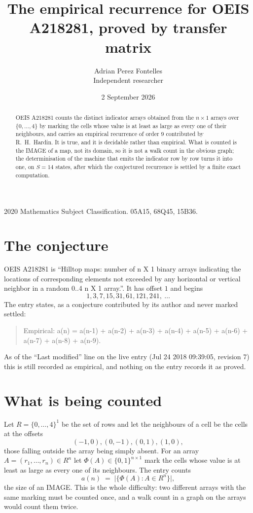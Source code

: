 \documentclass[11pt,a4paper]{article}
\title{The empirical recurrence for OEIS A218281, proved by transfer matrix}
\author{Adrian Perez Fontelles\\ \small Independent researcher}
\date{2 September 2026}
\theoremstyle{plain}
\theoremstyle{definition}
\begin{document}
\maketitle

\begin{abstract}
OEIS A218281 counts the distinct indicator arrays obtained from the $n\times1$ arrays over
$\{0,\dots,4\}$ by marking the cells whose value is at least as large as every one of their neighbours, and carries an
empirical recurrence of order $9$ contributed by R.~H.~Hardin. It is true, and it is
decidable rather than empirical. What is counted is the IMAGE of a map, not its domain, so it
is not a walk count in the obvious graph; the determinisation of the machine that emits the
indicator row by row turns it into one, on $S=14$ states, after which the conjectured
recurrence is settled by a finite exact computation.
\end{abstract}

\noindent\small 2020 Mathematics Subject Classification. 05A15, 68Q45, 15B36.\normalsize

\section{The conjecture}

OEIS A218281 is ``Hilltop maps: number of n X 1 binary arrays indicating the locations of corresponding elements not exceeded by any horizontal or vertical neighbor in a random 0..4 n X 1 array.''. It has offset $1$ and begins
\[
1, 3, 7, 15, 31, 61, 121, 241,\ \dots
\]
The entry states, as a conjecture contributed by its author and never marked settled:
\begin{quote}
Empirical: a(n) = a(n-1) + a(n-2) + a(n-3) + a(n-4) + a(n-5) + a(n-6) + a(n-7) + a(n-8) + a(n-9).
\end{quote}
As of the ``Last modified'' line on the live entry (Jul 24 2018 09:39:05, revision 7) this is still
recorded as empirical, and nothing on the entry records it as proved.

\section{What is being counted}

Let $R=\{0,\dots,4\}^{1}$ be the set of rows and let the neighbours of a cell be the
cells at the offsets
\[
(-1,0), (0,-1), (0,1), (1,0),
\]
those falling outside the array being simply absent. For an array
$A=(r_1,\dots,r_n)\in R^n$ let $\Phi(A)\in\{0,1\}^{n\times1}$ mark the cells whose value
is at least as large as every one of its neighbours. The entry counts
\[
a(n)\;=\;\bigl|\{\Phi(A):A\in R^n\}\bigr| ,
\]
the size of an IMAGE. This is the whole difficulty: two different arrays with the same marking
must be counted once, and a walk count in a graph on the arrays would count them twice.
\end{document}
